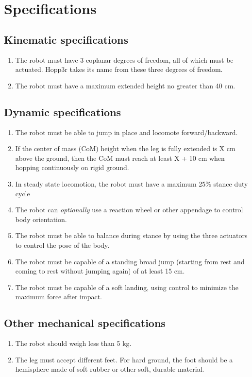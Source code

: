 \documentclass{report}
\begin{document}
\section[Specifications]{Specifications}\label{specifications}

\subsection{Kinematic specifications}
	\begin{enumerate}
		\item The robot must have 3 coplanar degrees of freedom, all of which must be actuated. Hopp3r takes its name from these three degrees of freedom.
		\item The robot must have a maximum extended height no greater than 40 cm. 
	\end{enumerate}
\subsection{Dynamic specifications}\label{spec:dynamics}
	\begin{enumerate}
		\item The robot must be able to jump in place and locomote forward/backward.
		\item If the center of mass (CoM) height when the leg is fully extended is X cm above the ground, then the CoM must reach at least X + 10 cm when hopping continuously on rigid ground.\label{spec:jumpheight}
		\item In steady state locomotion, the robot must have a maximum 25\% stance duty cycle
		\item The robot can \textit{optionally} use a reaction wheel or other appendage to control body orientation.
		\item The robot must be able to balance during stance by using the three actuators to control the pose of the body.
		\item The robot must be capable of a standing broad jump (starting from rest and coming to rest without jumping again) of at least 15 cm.\label{spec:broadjump}
		\item The robot must be capable of a soft landing, using control to minimize the maximum force after impact.
	\end{enumerate}
\subsection{Other mechanical specifications}
	\begin{enumerate}
		\item The robot should weigh less than 5 kg.
		\item The leg must accept different feet. For hard ground, the foot should be a hemisphere made of soft rubber or other soft, durable material.
	\end{enumerate}
\end{document}
